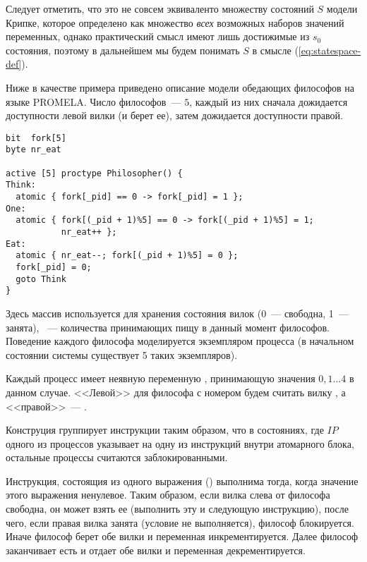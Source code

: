 Следует отметить, что это не совсем эквиваленто множеству состояний $S$ модели Крипке, которое
определено как множество \emph{всех} возможных наборов значений переменных, однако
практический смысл имеют лишь достижимые из $s_0$ состояния, поэтому в дальнейшем мы будем
понимать $S$ в смысле (\ref{eq:statespace-def}).

Ниже в качестве примера приведено описание модели обедающих философов на языке
PROMELA. Число философов~--- $5$, каждый из них сначала дожидается доступности левой вилки
(и берет ее), затем дожидается доступности правой.

\label{code:philo}

\begin{lstlisting}[float,language=Promela,style=simplecode,caption={Пример описания модели
    на языке PROMELA}]
bit  fork[5]
byte nr_eat

active [5] proctype Philosopher() {
Think:
  atomic { fork[_pid] == 0 -> fork[_pid] = 1 };
One:
  atomic { fork[(_pid + 1)%5] == 0 -> fork[(_pid + 1)%5] = 1; 
           nr_eat++ };
Eat:
  atomic { nr_eat--; fork[(_pid + 1)%5] = 0 };
  fork[_pid] = 0;
  goto Think
}  
\end{lstlisting}

Здесь массив  используется для хранения состояния вилок (0~--- свободна, 1~---
занята), ~--- количества принимающих пищу в данный момент
философов. Поведение каждого философа моделируется экземпляром процесса 
(в начальном состоянии системы существует 5 таких экземпляров). 

Каждый процесс имеет неявную переменную , принимающую значения $0, 1 \ldots 4$
в данном случае. <<Левой>> для философа с номером  будем считать вилку
, а <<правой>>~--- .

Конструция  группирует инструкции таким образом, что в состояниях, где $IP$
одного из процессов указывает на одну из инструкций внутри атомарного блока, остальные
процессы считаются заблокированными.

Инструкция, состоящия из одного выражения () выполнима тогда, когда
значение этого выражения ненулевое. Таким образом, если вилка слева от философа свободна,
он может взять ее (выполнить эту и следующую инструкцию), после чего, если правая вилка
занята (условие  не выполняется), философ
блокируется. Иначе философ берет обе вилки и переменная 
инкрементируется. Далее философ заканчивает есть и отдает обе вилки и переменная
 декрементируется.

